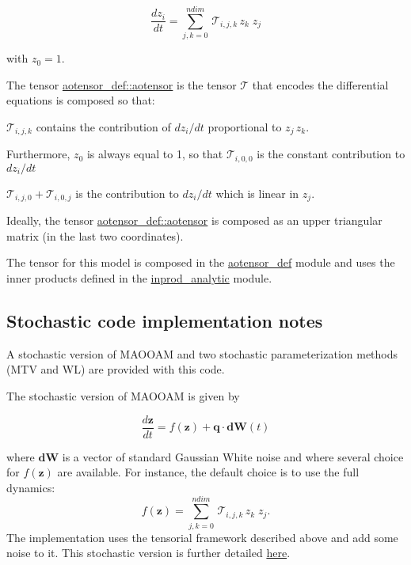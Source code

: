 \[ \frac{d z_i}{dt} = \sum_{j,k=0}^{ndim} \, \mathcal{T}_{i,j,k} \, z_k \; z_j \]

with $z_0 = 1$.

The tensor \hyperlink{namespaceaotensor__def_a0dc43bc9294a18f2fe57b67489f1702f}{aotensor\+\_\+def\+::aotensor} is the tensor $\mathcal{T}$ that encodes the differential equations is composed so that\+:


\begin{DoxyItemize}
\item $\mathcal{T}_{i,j,k}$ contains the contribution of $dz_i/dt$ proportional to $ z_j \, z_k$.
\item Furthermore, $z_0$ is always equal to 1, so that $\mathcal{T}_{i,0,0}$ is the constant contribution to $dz_i/dt$
\item $\mathcal{T}_{i,j,0} + \mathcal{T}_{i,0,j}$ is the contribution to $dz_i/dt$ which is linear in $z_j$.
\end{DoxyItemize}

Ideally, the tensor \hyperlink{namespaceaotensor__def_a0dc43bc9294a18f2fe57b67489f1702f}{aotensor\+\_\+def\+::aotensor} is composed as an upper triangular matrix (in the last two coordinates).

The tensor for this model is composed in the \hyperlink{namespaceaotensor__def}{aotensor\+\_\+def} module and uses the inner products defined in the \hyperlink{namespaceinprod__analytic}{inprod\+\_\+analytic} module. 



\subsection*{Stochastic code implementation notes}

A stochastic version of M\+A\+O\+O\+AM and two stochastic parameterization methods (M\+TV and WL) are provided with this code.

The stochastic version of M\+A\+O\+O\+AM is given by

\[ \frac{d \boldsymbol{z}}{dt} = f(\boldsymbol{z})+ \boldsymbol{q} \cdot \boldsymbol{dW} (t)\]

where $\boldsymbol{dW}$ is a vector of standard Gaussian White noise and where several choice for $f(\boldsymbol{z})$ are available. For instance, the default choice is to use the full dynamics\+: \[ f(\boldsymbol{z}) = \sum_{j,k=0}^{ndim} \, \mathcal{T}_{i,j,k} \, z_k \; z_j . \] The implementation uses the tensorial framework described above and add some noise to it. This stochastic version is further detailed \hyperlink{md_doc_sto_doc}{here}.

